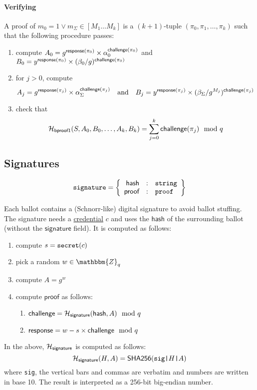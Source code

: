 \documentclass[a4paper]{article}
\newcommand{\Z}{\mathbbm{Z}}
\newcommand{\shatwo}{\textsf{SHA256}}
\newcommand{\jstring}{\texttt{string}}
\begin{document}
\paragraph{Verifying \oproof}
A proof of $m_0=1\lor m_\Sigma\in[M_1\dots M_k]$ is a $(k+1)$-tuple
$(\pi_0,\pi_1,\dotsc,\pi_k)$ such that the following procedure passes:
\begin{enumerate}
\item compute
  $A_0=g^{\textsf{response}(\pi_0)}\times\alpha_0^{\textsf{challenge}(\pi_0)}$
  and
  $B_0=y^{\textsf{response}(\pi_0)}\times(\beta_0/g)^{\textsf{challenge}(\pi_0)}$
\item for $j>0$, compute
  \[A_j=g^{\textsf{response}(\pi_j)}\times\alpha_\Sigma^{\textsf{challenge}(\pi_j)}
  \quad\text{and}\quad
  B_j=y^{\textsf{response}(\pi_j)}\times(\beta_\Sigma/g^{M_j})^{\textsf{challenge}(\pi_j)}\]
\item check that
  \[\mathcal{H}_{\textsf{bproof1}}(S,A_0,B_0,\dots,A_k,B_k)=\sum_{j=0}^k\textsf{challenge}(\pi_j)\mod q\]
\end{enumerate}

\subsection{Signatures}
\label{signatures}

\begin{gather*}
  \signature=\left\{
    \begin{array}{rcl}
      \textsf{hash}&:&\jstring\\
      \textsf{proof}&:&\proof
    \end{array}
  \right\}
\end{gather*}

\newcommand{\siglabel}{\textsf{signature}}

Each ballot contains a (Schnorr-like) digital signature to avoid
ballot stuffing. The signature needs a
\hyperref[credentials]{credential} $c$ and uses the $\textsf{hash}$ of
the surrounding ballot (without the $\siglabel$ field). It is computed
as follows:
\begin{enumerate}
\item compute $s=\texttt{secret}(c)$
\item pick a random $w\in\Z_q$
\item compute $A=g^w$
\item compute $\textsf{proof}$ as follows:
  \begin{enumerate}
  \item $\challenge=\Hash_\siglabel(\textsf{hash},A)\mod q$
  \item $\textsf{response}=w-s\times\textsf{challenge}\mod q$
  \end{enumerate}
\end{enumerate}
In the above, $\Hash_\siglabel$ is computed as follows:
\[
\Hash_\siglabel(H,A)=\shatwo(\verb=sig|=H\verb=|=A)
\]
where \verb=sig=, the vertical bars and commas are verbatim and
numbers are written in base 10. The result is interpreted as a 256-bit
big-endian number.
\end{document}
